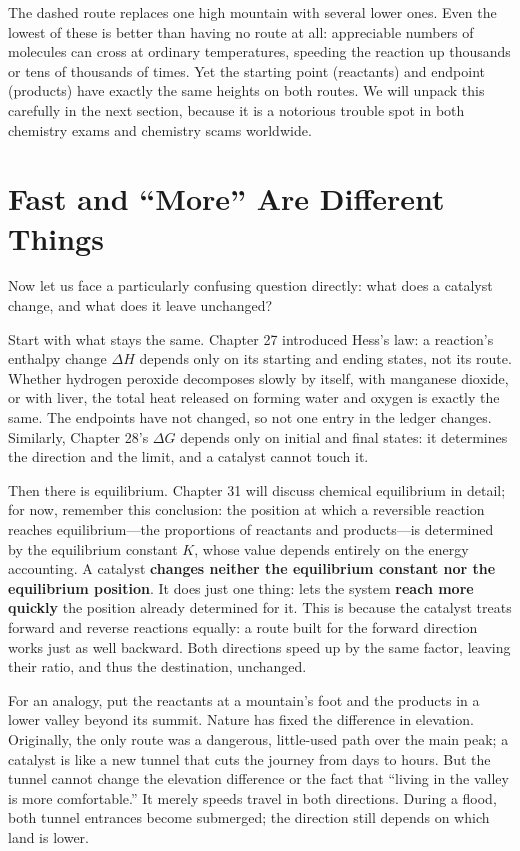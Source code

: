 The dashed route replaces one high mountain with several lower ones. Even the lowest of these is better than having no route at all: appreciable numbers of molecules can cross at ordinary temperatures, speeding the reaction up thousands or tens of thousands of times. Yet the starting point (reactants) and endpoint (products) have exactly the same heights on both routes. We will unpack this carefully in the next section, because it is a notorious trouble spot in both chemistry exams and chemistry scams worldwide.

\section{Fast and ``More'' Are Different Things}

Now let us face a particularly confusing question directly: what does a catalyst change, and what does it leave unchanged?

Start with what stays the same. Chapter 27 introduced Hess's law: a reaction's enthalpy change $\Delta H$ depends only on its starting and ending states, not its route. Whether hydrogen peroxide decomposes slowly by itself, with manganese dioxide, or with liver, the total heat released on forming water and oxygen is exactly the same. The endpoints have not changed, so not one entry in the ledger changes. Similarly, Chapter 28's $\Delta G$ depends only on initial and final states: it determines the direction and the limit, and a catalyst cannot touch it.

Then there is equilibrium. Chapter 31 will discuss chemical equilibrium in detail; for now, remember this conclusion: the position at which a reversible reaction reaches equilibrium---the proportions of reactants and products---is determined by the equilibrium constant $K$, whose value depends entirely on the energy accounting. A catalyst \textbf{changes neither the equilibrium constant nor the equilibrium position}. It does just one thing: lets the system \textbf{reach more quickly} the position already determined for it. This is because the catalyst treats forward and reverse reactions equally: a route built for the forward direction works just as well backward. Both directions speed up by the same factor, leaving their ratio, and thus the destination, unchanged.

For an analogy, put the reactants at a mountain's foot and the products in a lower valley beyond its summit. Nature has fixed the difference in elevation. Originally, the only route was a dangerous, little-used path over the main peak; a catalyst is like a new tunnel that cuts the journey from days to hours. But the tunnel cannot change the elevation difference or the fact that ``living in the valley is more comfortable.'' It merely speeds travel in both directions. During a flood, both tunnel entrances become submerged; the direction still depends on which land is lower.

